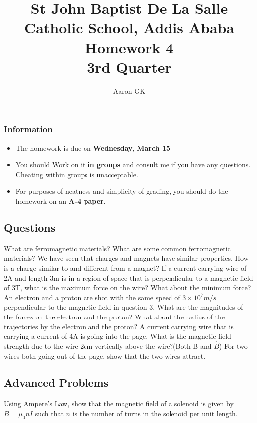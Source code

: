 \documentclass[9pt,addpoints]{exam}
\author{Aaron GK}
\begin{document}
	\title{St John Baptist De La Salle Catholic School, Addis Ababa\\
		\large Homework 4 \\
		3rd Quarter}
	\maketitle
	\begin{center}
		\subsubsection*{Information}
		\begin{itemize}
			\item The homework is due on \textbf{Wednesday}, \textbf{March 15}.
			\item You should Work on it \textbf{in groups} and consult me if you have any questions. Cheating within groups is unacceptable.
			\item For purposes of neatness and simplicity of grading, you should do the homework on an \textbf{A-4 paper}.
		\end{itemize}
	\end{center}
	\begin{center}
		\subsection*{Questions}
	\end{center}
	\begin{questions}
		\question What are ferromagnetic materials? What are some common ferromagnetic materials?
		\question We have seen that charges and magnets have similar properties. How is a charge similar to and different from a magnet?
		\question If a current carrying wire of 2A and length 3m is in a region of space that is perpendicular to a magnetic field of 3T, what is the maximum force on the wire? What about the minimum force?
		\question An electron and a proton are shot with the same speed of $3\times10^7m/s$ perpendicular to the magnetic field in question 3. What are the magnitudes of the forces on the electron and the proton? What about the radius of the trajectories by the electron and the proton?
		\question A current carrying wire that is carrying a current of 4A is going into the page. What is the magnetic field strength due to the wire 2cm vertically above the wire?(Both B and $\hat{B}$)
		\question For two wires both going out of the page, show that the two wires attract.
		\subsection*{Advanced Problems}
		\question Using Ampere's Law, show that the magnetic field of a solenoid is given by $B=\mu_0nI$ such that $n$ is the number of turns in the solenoid per unit length. 	
	\end{questions}		
\end{document}

